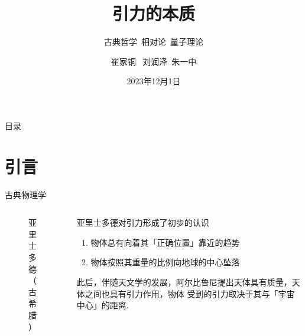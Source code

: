 \documentclass[10pt,aspectratio=43,mathserif]{beamer}
\title{引力的本质}
\subtitle{古典哲学\ 相对论\ 量子理论}
\author{崔家铜 \ 刘润泽\ 朱一中}
\institute{北京航空航天大学物理学院}
\date{2023年12月1日}
\begin{document}
\frame{\titlepage}
\begin{frame}{目录}
\tableofcontents
\end{frame}

\section{引言}
\begin{frame}{古典物理学}
    \begin{columns}
        \begin{column}{.3\linewidth}
            \centering
            \begin{figure}[thbp]
                \caption{\footnotesize 亚里士多德（古希腊）}
                \label{fig:ylsdd}
            \end{figure}
        \end{column}
        \hfill
        \begin{column}{.6\linewidth}
            亚里士多德对引力形成了初步的认识
            \begin{enumerate}
                \item 物体总有向着其「正确位置」靠近的趋势
                \item 物体按照其重量的比例向地球的中心坠落
            \end{enumerate}
            此后，伴随天文学的发展，阿尔比鲁尼提出天体具有质量，天体之间也具有引力作用，物体
            受到的引力取决于其与「宇宙中心」的距离\cite{starr2015lost}.
        \end{column}
    \end{columns}
\end{frame}
\end{document}
